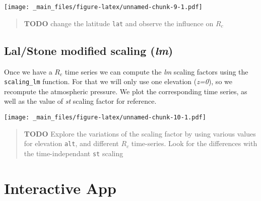 \documentclass[
]{book}
\newenvironment{Shaded}{\begin{snugshade}}{\end{snugshade}}
\newcommand{\AttributeTok}[1]{\textcolor[rgb]{0.77,0.63,0.00}{#1}}
\newcommand{\DecValTok}[1]{\textcolor[rgb]{0.00,0.00,0.81}{#1}}
\newcommand{\FunctionTok}[1]{\textcolor[rgb]{0.00,0.00,0.00}{#1}}
\newcommand{\NormalTok}[1]{#1}
\newcommand{\OtherTok}[1]{\textcolor[rgb]{0.56,0.35,0.01}{#1}}
\newcommand{\SpecialCharTok}[1]{\textcolor[rgb]{0.00,0.00,0.00}{#1}}
\newcommand{\StringTok}[1]{\textcolor[rgb]{0.31,0.60,0.02}{#1}}
\begin{document}
\texttt{[image: \_main\_files/figure-latex/unnamed-chunk-9-1.pdf]}

\begin{quote}
\textbf{TODO} change the latitude \texttt{lat} and observe the influence on \(R_c\)
\end{quote}

\hypertarget{lalstone-modified-scaling-lm}{%
\subsection{\texorpdfstring{Lal/Stone modified scaling (\emph{lm})}{Lal/Stone modified scaling (lm)}}\label{lalstone-modified-scaling-lm}}

Once we have a \(R_c\) time series we can compute the \emph{lm} scaling factors using the \texttt{scaling\_lm} function.
For that we will only use one elevation (\emph{z=0}), so we recompute the atmospheric pressure.
We plot the corresponding time series, as well as the value of \emph{st} scaling factor for reference.

\begin{Shaded}
\end{Shaded}

\texttt{[image: \_main\_files/figure-latex/unnamed-chunk-10-1.pdf]}

\begin{quote}
\textbf{TODO} Explore the variations of the scaling factor by using various values for elevation \texttt{alt}, and different \(R_c\) time-series. Look for the differences with the time-independant \texttt{st} scaling
\end{quote}

\hypertarget{interactive-app}{%
\section{Interactive App}\label{interactive-app}}
\end{document}
